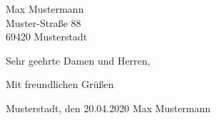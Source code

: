 \documentclass[
    11pt,
    a4paper,
    letter,
    parskip=yes,
    ]{scrlttr2}
\date{\today}
\begin{document}
\begin{letter}{
Max Mustermann\\
Muster-Straße 88\\
69420 Musterstadt}

\opening{Sehr geehrte Damen und Herren,}

\lipsum[6]

\closing{Mit freundlichen Grüßen}




\hline
Musterstadt, den 20.04.2020\hspace{40pt} Max Mustermann
\end{letter}
\end{document}
